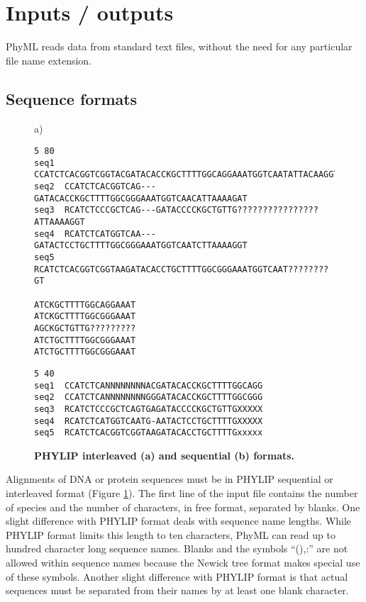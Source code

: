 \documentclass[a4paper,12pt]{article}
\begin{document}
\section{Inputs / outputs}\label{sec:input_output}

PhyML reads data from standard text files,  without the need for any particular file name extension.

\subsection{Sequence formats}

\begin{figure}
a)
\begin{small}
\begin{verbatim}
5 80
seq1  CCATCTCACGGTCGGTACGATACACCKGCTTTTGGCAGGAAATGGTCAATATTACAAGGT
seq2  CCATCTCACGGTCAG---GATACACCKGCTTTTGGCGGGAAATGGTCAACATTAAAAGAT
seq3  RCATCTCCCGCTCAG---GATACCCCKGCTGTTG????????????????ATTAAAAGGT
seq4  RCATCTCATGGTCAA---GATACTCCTGCTTTTGGCGGGAAATGGTCAATCTTAAAAGGT
seq5  RCATCTCACGGTCGGTAAGATACACCTGCTTTTGGCGGGAAATGGTCAAT????????GT

ATCKGCTTTTGGCAGGAAAT
ATCKGCTTTTGGCGGGAAAT
AGCKGCTGTTG?????????
ATCTGCTTTTGGCGGGAAAT
ATCTGCTTTTGGCGGGAAAT
\end{verbatim}
\begin{verbatim}
5 40
seq1  CCATCTCANNNNNNNNACGATACACCKGCTTTTGGCAGG
seq2  CCATCTCANNNNNNNNGGGATACACCKGCTTTTGGCGGG
seq3  RCATCTCCCGCTCAGTGAGATACCCCKGCTGTTGXXXXX
seq4  RCATCTCATGGTCAATG-AATACTCCTGCTTTTGXXXXX
seq5  RCATCTCACGGTCGGTAAGATACACCTGCTTTTGxxxxx
\end{verbatim}
\end{small}
\label{fig:align_tree}
\caption{\bf PHYLIP interleaved (a) and sequential (b) formats.}
\end{figure}

Alignments  of  DNA  or  protein   sequences  must  be  in  PHYLIP  sequential  or
interleaved format  (Figure \ref{fig:align_tree}).  The  first line of  the input
file contains  the number  of species and  the number  of characters, in  free format,  separated by
blanks.  One  slight difference with PHYLIP format  deals with sequence name  lengths.  While PHYLIP
format limits this  length to ten characters, PhyML  can read up to hundred  character long sequence
names.  Blanks  and the symbols ``(),:''  are not allowed  within sequence names because  the Newick
tree format  makes special use of  these symbols.  Another  slight difference with PHYLIP  format is
that actual sequences must be separated from their names by at least one blank character.
\end{document}
